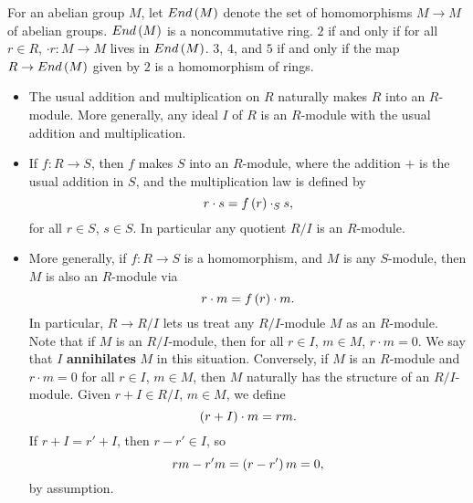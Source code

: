 \begin{note*}
For an abelian group $ M $, let $ End\left( M \right) $ denote the set of homomorphisms $ M \to M $ of abelian groups. $ End\left( M \right) $ is a noncommutative ring. $ 2 $ if and only if for all $ r \in R $, $ \cdot r : M \to M $ lives in $ End\left( M \right) $. $ 3 $, $ 4 $, and $ 5 $ if and only if the map $ R \to End\left( M \right) $ given by $ 2 $ is a homomorphism of rings.
\end{note*}

\begin{example*}
\hfill
\begin{itemize}
\item The usual addition and multiplication on $ R $ naturally makes $ R $ into an $ R $-module. More generally, any ideal $ I $ of $ R $ is an $ R $-module with the usual addition and multiplication.
\item If $ f : R \to S $, then $ f $ makes $ S $ into an $ R $-module, where the addition $ + $ is the usual addition in $ S $, and the multiplication law is defined by
$$ r \cdot s = f\left( r \right) \cdot_S s, $$
for all $ r \in S $, $ s \in S $. In particular any quotient $ R / I $ is an $ R $-module.
\item More generally, if $ f : R \to S $ is a homomorphism, and $ M $ is any $ S $-module, then $ M $ is also an $ R $-module via
$$ r \cdot m = f\left( r \right) \cdot m. $$
In particular, $ R \to R / I $ lets us treat any $ R / I $-module $ M $ as an $ R $-module. Note that if $ M $ is an $ R / I $-module, then for all $ r \in I $, $ m \in M $, $ r \cdot m = 0 $. We say that $ I $ \textbf{annihilates} $ M $ in this situation. Conversely, if $ M $ is an $ R $-module and $ r \cdot m = 0 $ for all $ r \in I $, $ m \in M $, then $ M $ naturally has the structure of an $ R / I $-module. Given $ r + I \in R / I $, $ m \in M $, we define
$$ \left( r + I \right) \cdot m = rm. $$
If $ r + I = r' + I $, then $ r - r' \in I $, so
$$ rm - r'm = \left( r - r' \right)m = 0, $$
by assumption.

\pagebreak


\end{itemize}
\end{example*}
